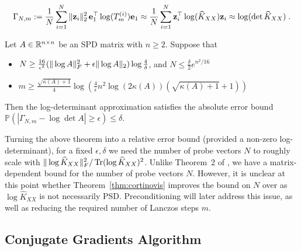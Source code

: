 \documentclass{article}
\begin{document}
\begin{equation*}
    \Gamma_{N, m} := \frac{1}{N} \sum_{i=1}^N \Vert \boldsymbol{\mathbf{z}}_i \Vert_2^2 \, \boldsymbol{\mathbf{e}}_1^\top \log(T_m^{(i)}) \boldsymbol{\mathbf{e}}_1
    \approx \frac{1}{N} \sum_{i=1}^N \boldsymbol{\mathbf{z}}_i^\top \log(\widehat K_{XX}) \boldsymbol{\mathbf{z}}_i
    \approx \log(\det \widehat K_{XX}) \; .
\end{equation*}

\begin{theorem} \label{thm:cortinovis}
Let $A \in \mathbb R^{n\times n}$ be an SPD matrix with $n \ge 2$. Suppose that 
\begin{itemize}
    \item $N \ge \frac{16}{\epsilon^2} (\Vert \log A \Vert_F^2 + \epsilon \Vert \log A \Vert_2) \log\frac{4}{\delta}$, and $N \le \frac{\delta}{2} e^{n^2/16}$
    \item $m \ge \frac{\sqrt{\kappa(A) + 1}}{4} \log\left( \frac{4}{\epsilon} n^2 \log(2\kappa(A)) (\sqrt{\kappa(A) + 1} + 1) \right)$
\end{itemize}
Then the log-determinant approximation satisfies the absolute error bound $\mathbb P( | \Gamma_{N, m} - \log\det A | \ge \epsilon) \le \delta$.
\end{theorem}

Turning the above theorem into a relative error bound (provided a non-zero log-determinant), for a fixed $\epsilon, \delta$ we need the number of probe vectors $N$ to roughly scale with $\Vert \log \widehat K_{XX} \Vert_F^2 / \operatorname{Tr}(\log \widehat K_{XX})^2$. 
Unlike Theorem~2 of \cite{gardner_gpytorch_2021}, we have a matrix-dependent bound for the number of probe vectors $N$. However, it is unclear at this point whether Theorem~\ref{thm:cortinovis} improves the bound on $N$ over \cite{gardner_gpytorch_2021} as $\log \widehat K_{XX}$ is not necessarily PSD.
Preconditioning will later address this issue, as well as reducing the required number of Lanczos steps $m$.

\subsection{Conjugate Gradients Algorithm} \label{sec:cg}
\end{document}
